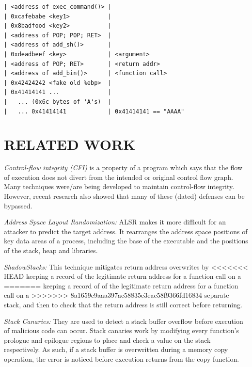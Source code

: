 \documentclass[10pt,twocolumn]{article}
\begin{document}


\begin{lstlisting}[float,aboveskip=\bigskipamount,belowskip=\medskipamount,caption=Stack
prepared with a ROP chain]
| <address of exec_command()> |
| 0xcafebabe <key1>           |
| 0x8badfood <key2>           |
| <address of POP; POP; RET>  |
| <address of add_sh()>       |
| 0xdeadbeef <key>            | <argument>
| <address of POP; RET>       | <return addr>
| <address of add_bin()>      | <function call>
| 0x42424242 <fake old %ebp>  |
| 0x41414141 ...              |
|   ... (0x6c bytes of 'A's)  |
|   ... 0x41414141            | 0x41414141 == "AAAA"
\end{lstlisting}


\section{RELATED WORK}

\textit{Control-flow integrity (CFI)\cite{mulder_subject_2016}} is a property
of a program which says that the flow of execution does not divert from the
intended or original control flow graph. Many techniques were/are being
developed to maintain control-flow integrity. However, recent research also
showed that many of these (dated) defenses can be bypassed.

\textit{Address Space Layout Randomization:} ALSR makes it more difficult for
an attacker to predict the target address. It rearranges the address space
positions of key data areas of a process, including the base of the executable
and the positions of the stack, heap and libraries.

\textit{ShadowStacks:} This technique mitigates return address overwrites by
<<<<<<< HEAD
keeping a record of the legitimate return address for a function call on a
=======
keeping a record of of the legitimate return address for a function call on a
>>>>>>> 8a1659c9aaa397ac58835e3eac58f9366fd16834
separate stack, and then to check that the return address is still correct
before returning.

\textit{Stack Canaries:} They are used to detect a stack buffer overflow before
execution of malicious code can occur. Stack canaries work by modifying every
function's prologue and epilogue regions to place and check a value on the
stack respectively. As such, if a stack buffer is overwritten during a memory
copy operation, the error is noticed before execution returns from the copy
function.
\end{document}
